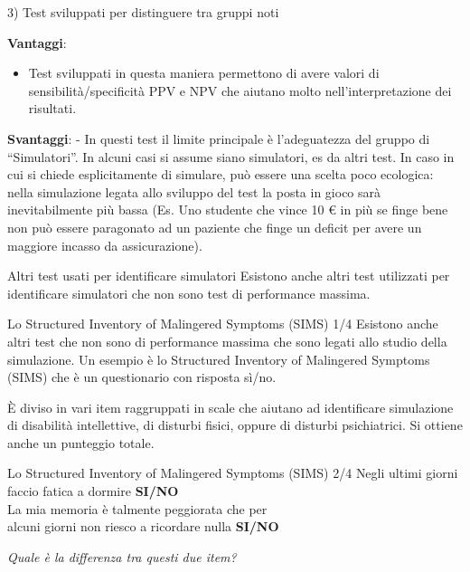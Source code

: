 \documentclass[
  ignorenonframetext,
  aspectratio=169,
]{beamer}
\providecommand{\tightlist}{%
  \setlength{\itemsep}{0pt}\setlength{\parskip}{0pt}}
\begin{document}
\begin{frame}{3) Test sviluppati per distinguere tra gruppi noti}
\label{test-sviluppati-per-distinguere-tra-gruppi-noti}
\small

\textbf{Vantaggi}:

\begin{itemize}
\tightlist
\item
  Test sviluppati in questa maniera permettono di avere valori di
  sensibilità/specificità PPV e NPV che aiutano molto
  nell'interpretazione dei risultati.
\end{itemize}

\textbf{Svantaggi}: - In questi test il limite principale è
l'adeguatezza del gruppo di ``Simulatori''. In alcuni casi si assume
siano simulatori, es da altri test. In caso in cui si chiede
esplicitamente di simulare, può essere una scelta poco ecologica: nella
simulazione legata allo sviluppo del test la posta in gioco sarà
inevitabilmente più bassa (Es. Uno studente che vince 10 € in più se
finge bene non può essere paragonato ad un paziente che finge un deficit
per avere un maggiore incasso da assicurazione).
\end{frame}

\begin{frame}{Altri test usati per identificare simulatori}
\label{altri-test-usati-per-identificare-simulatori}
Esistono anche altri test utilizzati per identificare simulatori che non
sono test di performance massima.
\end{frame}

\begin{frame}{Lo Structured Inventory of Malingered Symptoms (SIMS) 1/4}
\label{lo-structured-inventory-of-malingered-symptoms-sims-14}
Esistono anche altri test che non sono di performance massima che sono
legati allo studio della simulazione. Un esempio è lo Structured
Inventory of Malingered Symptoms (SIMS) che è un questionario con
risposta sì/no.

È diviso in vari item raggruppati in scale che aiutano ad identificare
simulazione di disabilità intellettive, di disturbi fisici, oppure di
disturbi psichiatrici. Si ottiene anche un punteggio totale.
\end{frame}

\begin{frame}{Lo Structured Inventory of Malingered Symptoms (SIMS) 2/4}
\label{lo-structured-inventory-of-malingered-symptoms-sims-24}
\vfill
\small
Negli ultimi giorni faccio fatica a dormire \hfill \textbf{SI/NO}\\
\vspace{3em}
La mia memoria è talmente  peggiorata che per\\ alcuni giorni non riesco a ricordare nulla \hfill \textbf{SI/NO}

\pause

\emph{Quale è la differenza tra questi due item?}
\end{frame}
\end{document}
